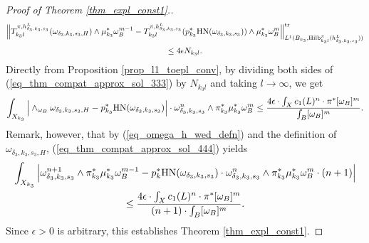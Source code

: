 \documentclass[12pt]{article}
\numberwithin{equation}{section}
\theoremstyle{theorem}
\theoremstyle{definition}
\theoremstyle{remark}
\begin{document}
\begin{proof}[Proof of Theorem \ref{thm_expl_const1}.]
\begin{multline}
			\Big\|
				T_{k_3 l}^{\pi, h^L_{\delta_3, k_3, s_3}}(\omega_{\delta_3, k_3, s_3, H})	\wedge
				\mu_{k_3}^* \omega_B^{m - 1}
				- 
				T_{k_ 3l}^{\pi, h^L_{\delta_3, k_3, s_3}}(p_{k_3}^* {\rm{HN}}(\omega_{\delta_3, k_3, s_3})) \wedge
				\mu_{k_3}^* \omega_B^m
			\Big\|_{L^1(B_{k_3}, {\textrm{Hilb}}^{\pi}_{k_3 l}(h^L_{\delta_3, k_3, s_3}))}^{{\rm{tr}}}
			\\
			\leq
			4 \epsilon N_{k_3 l}.
		\end{multline}
		Directly from Proposition \ref{prop_l1_toepl_conv}, by dividing both sides of (\ref{eq_thm_compat_approx_sol_333}) by $N_{k_3 l}$ and taking $l \to \infty$, we get
		\begin{equation}\label{eq_thm_compat_approx_sol_444}
			\int_{X_{k_3}}
			\Big| \wedge_{\omega_B} \omega_{\delta_3, k_3, s_3, H} - p_{k_3}^* {\rm{HN}}(\omega_{\delta_3, k_3, s_3}) \Big| \cdot \omega_{\delta_3, k_3, s_3}^n \wedge \pi_{k_3}^* \mu_{k_3}^* \omega_B^m
			\leq
			\frac{4 \epsilon \cdot \int_X c_1(L)^n \cdot \pi^* [\omega_B]^m}{\int_B [\omega_B]^m}.
		\end{equation}
		Remark, however, that by (\ref{eq_omega_h_wed_defn}) and the definition of $\omega_{\delta_3, k_3, s_3, H}$, (\ref{eq_thm_compat_approx_sol_444}) yields
		\begin{multline}
			\int_{X_{k_3}}
			\Big|
			\omega_{\delta_3, k_3, s_3}^{n + 1} \wedge \pi_{k_3}^* \mu_{k_3}^* \omega_B^{m - 1}
			-
			p_k^* {\rm{HN}}(\omega_{\delta_3, k_3, s_3}) \cdot \omega_{\delta_3, k_3, s_3}^n \wedge  \pi_{k_3}^* \mu_{k_3}^* \omega_B^m \cdot (n + 1)
			\Big|
			\\
			\leq
			\frac{4 \epsilon \cdot \int_X c_1(L)^n \cdot \pi^* [\omega_B]^m}{(n + 1) \cdot \int_B [\omega_B]^m}.
		\end{multline}
		Since $\epsilon > 0$ is arbitrary, this establishes Theorem \ref{thm_expl_const1}.
	\end{proof}

	
	
\end{document}
